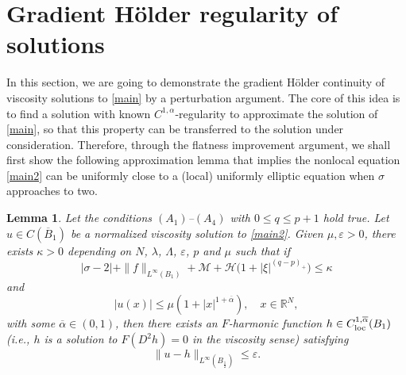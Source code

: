 \documentclass[11pt,reqno]{amsart}
\numberwithin{equation}{section}
\newtheorem{lemma}[theorem]{Lemma}
\begin{document}
\section{Gradient H\"{o}lder regularity of solutions}
\label{sec4}

In this section, we are going to demonstrate the gradient H\"{o}lder continuity of viscosity solutions to \eqref{main} by a perturbation argument. The core of this idea is to find a solution with known $C^{1,\alpha}$-regularity to approximate the solution of \eqref{main}, so that this property can be transferred to the solution under consideration. Therefore, through the flatness improvement argument, we shall first show the following approximation lemma that implies the nonlocal equation \eqref{main2} can be uniformly close to a (local) uniformly elliptic equation when $\sigma$ approaches to two.

\begin{lemma}
\label{lem4-1}
Let the conditions $(A_1)$--$(A_4)$ with $0\le q\le p+1$ hold true. Let $u\in C(\overline{B}_1)$ be a normalized viscosity solution to \eqref{main2}.
Given $\mu,\varepsilon>0$, there exists $\kappa>0$ depending on $N$, $\lambda$, $\Lambda$, $\varepsilon$, $p$ and $\mu$ %
such that if
$$
|\sigma-2|+\|f\|_{L^\infty(B_1)}+\mathcal{M}+\mathcal{H}\bigl(1+|\xi|^{(q-p)_+}\bigr)\leq \kappa
$$
and
$$
|u(x)|\le\mu(1+|x|^{1+\overline{\alpha}}), \quad  x\in\mathbb{R}^N,
$$
with some $\overline{\alpha}\in(0,1)$, then there exists an $F$-harmonic function $h\in C^{1,\overline{\alpha}}_{\rm loc}(B_1)$ (i.e., $h$ is a solution to $F(D^2h)=0$ in the viscosity sense) satisfying
$$
\|u-h\|_{L^\infty(B_{\frac12})}\leq \varepsilon.
$$
\end{lemma}
\end{document}
